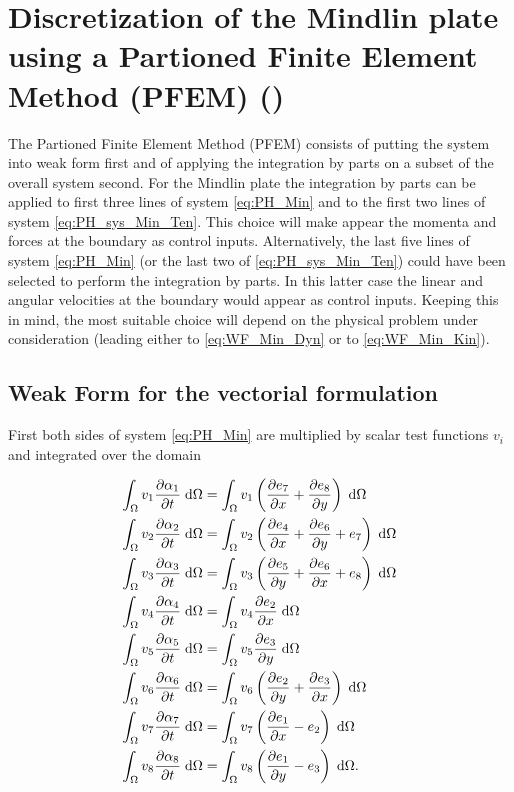 \documentclass[preprint,12pt]{elsarticle}
\begin{document}
\section{Discretization of the Mindlin plate using a Partioned Finite Element Method (PFEM) (\cite{CardosoRibeiro2018})}
The Partioned Finite Element Method (PFEM) consists of putting the system into weak form first and of applying the integration by parts on a subset of the overall system second. For the Mindlin plate the integration by parts can be applied to first three lines of system \eqref{eq:PH_Min} and to the first two lines of system \eqref{eq:PH_sys_Min_Ten}. This choice will make appear the momenta and forces at the boundary as control inputs. Alternatively, the last five lines of system \eqref{eq:PH_Min} (or the last two of \eqref{eq:PH_sys_Min_Ten}) could have been selected to perform the integration by parts. In this latter case the linear and angular velocities at the boundary would appear as control inputs. Keeping this in mind, the most suitable choice will depend on the physical problem under consideration (leading either to \eqref{eq:WF_Min_Dyn} or to \eqref{eq:WF_Min_Kin}). 

\subsection{Weak Form for the vectorial formulation}

First both sides of system \eqref{eq:PH_Min} are multiplied by scalar test functions $v_i$ and integrated over the domain

\begin{align}
\int_{\Omega} v_1 \diffp{\alpha_1}{t} \d\Omega &= \int_{\Omega} v_1 \left(\diffp{e_7}{x} + \diffp{e_8}{y} \right) \d\Omega  \label{eq:line1_min}\\\int_{\Omega} v_2 \diffp{\alpha_2}{t} \d\Omega &= \int_{\Omega} v_2 \left(\diffp{e_4}{x} + \diffp{e_6}{y} + e_7 \right) \d\Omega  \label{eq:line2_min} \\
\int_{\Omega} v_3 \diffp{\alpha_3}{t} \d\Omega &= \int_{\Omega} v_3 \left(\diffp{e_5}{y} + \diffp{e_6}{x} + e_8 \right) \d\Omega  \label{eq:line3_min}\\
\int_{\Omega} v_4 \diffp{\alpha_4}{t} \d\Omega &= \int_{\Omega} v_4 \diffp{e_2}{x} \d\Omega   \label{eq:line4_min}\\
\int_{\Omega} v_5 \diffp{\alpha_5}{t} \d\Omega &=  \int_{\Omega} v_5 \diffp{e_3}{y} \d\Omega \\
\int_{\Omega} v_6 \diffp{\alpha_6}{t} \d\Omega &= \int_{\Omega} v_6 \left(\diffp{e_2}{y} + \diffp{e_3}{x}\right) \d\Omega\\
\int_{\Omega} v_7 \diffp{\alpha_7}{t} \d\Omega &= \int_{\Omega} v_7 \left(\diffp{e_1}{x} - e_2 \right) \d\Omega\\
\int_{\Omega} v_8 \diffp{\alpha_8}{t} \d\Omega &= \int_{\Omega} v_8 \left(\diffp{e_1}{y} - e_3 \right) \d\Omega.   \label{eq:line8_min}
\end{align}
\end{document}

